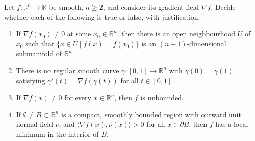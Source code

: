 \begin{exercise}
\label{ex:gradient_field_four_verdicts}
Let $f : \mathbb{R}^n \to \mathbb{R}$ be smooth, $n \geq 2$, and consider its gradient field
$\nabla f$. Decide whether each of the following is true or false, with justification.
\begin{enumerate}[label=\textbf{(\alph*)}]
  \item If $\nabla f(x_0) \neq 0$ at some $x_0 \in \mathbb{R}^n$, then there is an open
    neighbourhood $U$ of $x_0$ such that $\{x \in U \mid f(x) = f(x_0)\}$ is an
    $(n-1)$-dimensional submanifold of $\mathbb{R}^n$.
  \item There is no regular smooth curve $\gamma : [0,1] \to \mathbb{R}^n$ with
    $\gamma(0) = \gamma(1)$ satisfying $\gamma'(t) = \nabla f(\gamma(t))$ for all $t \in [0,1]$.
  \item If $\nabla f(x) \neq 0$ for every $x \in \mathbb{R}^n$, then $f$ is unbounded.
  \item If $\emptyset \neq B \subset \mathbb{R}^n$ is a compact, smoothly bounded region with
    outward unit normal field $\nu$, and $\langle\nabla f(x),\nu(x)\rangle > 0$ for all
    $x \in \partial B$, then $f$ has a local minimum in the interior of $B$.
\end{enumerate}
\end{exercise}


